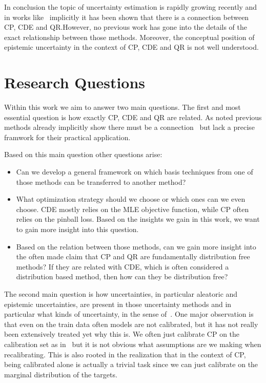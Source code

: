 In conclusion the topic of uncertainty estimation is rapidly growing recently and in works like~\cite{chernozhukov2021distributional} implicitly it has been shown that there is a connection between CP, CDE and QR.\@ However, no previous work has gone into the details of the exact relationship between those methods. Moreover, the conceptual position of epistemic uncertainty in the context of CP, CDE and QR is not well understood.

\section{Research Questions}\label{sec:questions}

Within this work we aim to answer two main questions. The first and most essential question is how exactly CP, CDE and QR are related. As noted previous methods already implicitly show there must be a connection~\cite{sesia2021conformal,chernozhukov2021distributional,chung2020beyond} but lack a precise framwork for their practical application.

Based on this main question other questions arise:

\begin{itemize}
    \item Can we develop a general framework on which basis techniques from one of those methods can be transferred to another method?
    \item What optimization strategy should we choose or which ones can we even choose. CDE mostly relies on the MLE objective function, while CP often relies on the pinball loss. Based on the insights we gain in this work, we want to gain more insight into this question.
    \item Based on the relation between those methods, can we gain more insight into the often made claim that CP and QR are fundamentally distribution free methods? If they are related with CDE, which is often considered a distribution based method, then how can they be distribution free?
\end{itemize}

The second main question is how uncertainties, in particular aleatoric and epistemic uncertainties, are present in those uncertainty methods and in particular what kinds of uncertainty, in the sense of~\cite{hullermeier_aleatoric_2021}. One major observation is that even on the train data often models are not calibrated, but it has not really been extensively treated yet why this is. We often just calibrate CP on the calibration set as in~\cite{sesia2021conformal} but it is not obvious what assumptions are we making when recalibrating. This is also rooted in the realization that in the context of CP, being calibrated alone is actually a trivial task since we can just calibrate on the marginal distribution of the targets.

